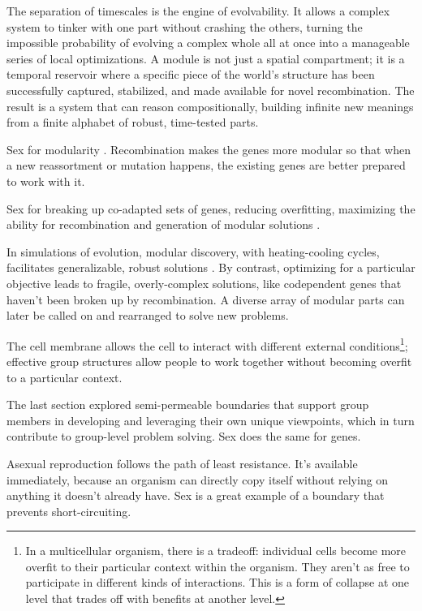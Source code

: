 The separation of timescales is the engine of evolvability. It allows a complex system to tinker with one part without crashing the others, turning the impossible probability of evolving a complex whole all at once into a manageable series of local optimizations. A module is not just a spatial compartment; it is a temporal reservoir where a specific piece of the world's structure has been successfully captured, stabilized, and made available for novel recombination. The result is a system that can reason compositionally, building infinite new meanings from a finite alphabet of robust, time-tested parts.

Sex for modularity \citep{melo2016modularity}. Recombination makes the genes more modular so that when a new reassortment or mutation happens, the existing genes are better prepared to work with it.

Sex for breaking up co-adapted sets of genes, reducing overfitting, maximizing the ability for recombination and generation of modular solutions \citep{srivastava2014dropout, livnat2008mixability}. 

In simulations of evolution, modular discovery, with heating-cooling cycles, facilitates generalizable, robust solutions \citep{woolley2011deleterious}. By contrast, optimizing for a particular objective leads to fragile, overly-complex solutions, like codependent genes that haven't been broken up by recombination. A diverse array of modular parts can later be called on and rearranged to solve new problems.

The cell membrane allows the cell to interact with different external conditions\footnote{In a multicellular organism, there is a tradeoff: individual cells become more overfit to their particular context within the organism. They aren't as free to participate in different kinds of interactions. This is a form of collapse at one level that trades off with benefits at another level.}; effective group structures allow people to work together without becoming overfit to a particular context. 

The last section explored semi-permeable boundaries that support group members in developing and leveraging their own unique viewpoints, which in turn contribute to group-level problem solving. Sex does the same for genes. 


Asexual reproduction follows the path of least resistance. It's available immediately, because an organism can directly copy itself without relying on anything it doesn't already have. Sex is a great example of a boundary that prevents short-circuiting. 

